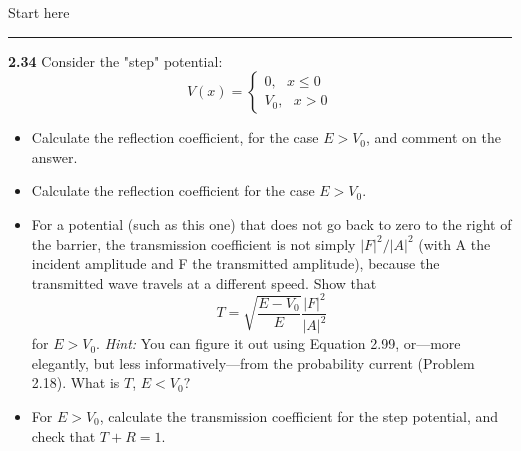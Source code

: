 \documentclass[fleqn]{article}
\begin{document}
    \textcolor{hwColor}{
      Start here 
    }

  \rule{15cm}{1pt}

  \textbf{2.34}
  Consider the "step" potential: 
  $$V(x)=\begin{cases}
    0, ~~~ x\leqslant 0 \\
    V_0, ~~~ x > 0
  \end{cases}$$
  \begin{itemize}
    \item Calculate the reflection coefficient, for the case $E>V_0$, and comment on the answer.

    \item Calculate the reflection coefficient for the case $E>V_0$.

    \item For a potential (such as this one) that does not go back to zero to the right of the barrier,
    the transmission coefficient is not simply $|F|^2/|A|^2$ (with A the incident amplitude and F
    the transmitted amplitude), because the transmitted wave travels at a different speed. Show
    that
    $$T=\sqrt{\dfrac{E-V_0}{E}}\dfrac{|F|^2}{|A|^2}$$
    for $E>V_0$. \emph{Hint:} You can figure it out using Equation 2.99, or—more elegantly, but less
    informatively—from the probability current (Problem 2.18). What is $T$, $E<V_0?$

    \item For $E>V_0$, calculate the transmission coefficient for the step potential, and check that $T+R=1$.
    
  \end{itemize}
\end{document}
